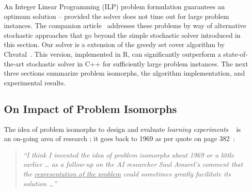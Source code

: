 An Integer Linear Programming (ILP) problem formulation
guarantees an optimum solution -- provided the solver does not time out for large problem instances. The companion 
article~\cite{OPUS2-2022-mclass-arxiv-Brglez} addresses these problems
by way of alternative stochastic approaches that go beyond the simple stochastic solver introduced in this section. Our solver is a extension of the greedy set cover algorithm by 
Chvatal~\cite{
  OPUS-setc-1979-OR-Chvatal-greedy,
  OPUS-setc-2016-Springer-Young-Greedy}.
This version, implemented in R, can significantly outperform a state-of-the-art stochastic solver in C++ for sufficiently large problem instances. 
The next three sections summarize problem isomorphs,  the  algorithm implementation, and experimental results.


\subsection{{\sf On Impact of Problem Isomorphs}}
\noindent
The idea of problem isomorphs 
to design and evaluate {\em learning experiments}
~\cite{OPUS-isomorph-1976-CognitivePhychology-Simon_Hayes}
is an on-going area of research
\cite{OPUS-isomorph-2001-Erlbaum-Gunzelmann-ACT-R_model};
it goes back to 1969
as per quote on page 382~\cite{OPUS-isomorph-1996-MITPress-Simon-Models}:
\begin{quote}
  {\it
  “I think I invented the idea of problem isomorphs about 1969 
   or a little earlier … as a follow-up on the AI researcher 
   Saul Amarel’s comment that the 
   \underline{representation of the problem} 
   could sometimes greatly facilitate its solution …”
   }
\end{quote}



